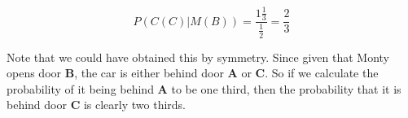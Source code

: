 \documentclass[]{article}
\begin{document}
\[\begin{equation}
P(C(C)|M(B))=\frac{1\frac{1}{3}}{\frac{1}{2}}=\frac{2}{3}
\end{equation}\]

Note that we could have obtained this by symmetry. Since given that
Monty opens door \textbf{B}, the car is either behind door \textbf{A} or
\textbf{C}. So if we calculate the probability of it being behind
\textbf{A} to be one third, then the probability that it is behind door
\textbf{C} is clearly two thirds.
\end{document}
